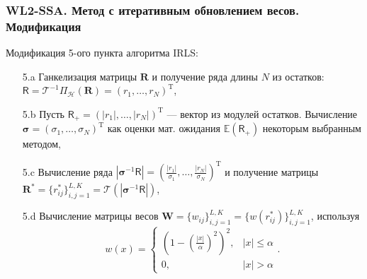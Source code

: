 \documentclass[10pt, ucs, notheorems, handout]{beamer}
\newcommand{\tX}[1]{\mathsf{#1}}
\begin{document}
\begin{frame}
\frametitle{WL2-SSA. Метод с итеративным обновлением весов. Модификация}
Модификация 5-ого пункта алгоритма IRLS:\\
\begin{enumerate}
\item [5.a]  Ганкелизация матрицы $\mathbf{R}$ и получение ряда длины $N$ из остатков: $\tX{R} = \mathcal{T}^{-1} \Pi_{\mathcal{H}} (\mathbf{R}) = (r_1,\ldots,r_N)^\mathrm{T}$,
\item [5.b] Пусть $\tX{R}_+=(|r_1|, \ldots, |r_N|)^\mathrm{T}$ --- вектор из модулей остатков. Вычисление $\bm{\sigma} = (\sigma_1,\ldots,\sigma_{N})^\mathrm{T}$ как оценки мат. ожидания $\mathbb{E}(\tX{R}_+)$ некоторым выбранным методом,
\item [5.c]  Вычисление ряда $|\bm{\sigma}^{-1}\tX{R}| = (\frac{|r_1|}{\sigma_1},\ldots,\frac{|r_N|}{\sigma_N})^\mathrm{T}$ и получение матрицы $\mathbf{R}^{*} = \{r_{ij}^*\}_{i,j=1}^{L,K} = \mathcal{T} (|\bm{\sigma}^{-1}\tX{R}|)$,
\item [5.d] Вычисление матрицы весов $\mathbf{W}= \{w_{ij}\}_{i,j=1}^{L,K} = \{w(r_{ij}^*)\}_{i,j=1}^{L,K}$, используя %
\begin{equation*}
w(x) = 
\begin{cases}
(1-(\frac{|x|}{\alpha})^2)^2, &|x|\le\alpha\\
0, &|x|>\alpha
\end{cases}. %
\end{equation*} 
\end{enumerate}
\end{frame}
\end{document}
